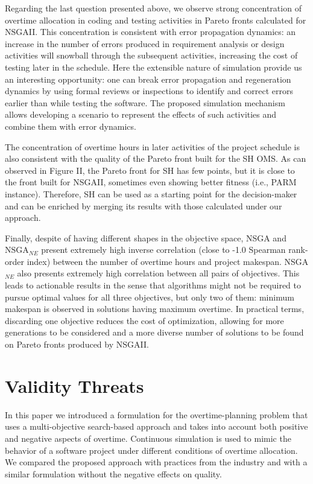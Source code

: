 \documentclass[conference]{IEEEtran}
\begin{document}
Regarding the last question presented above, we observe strong concentration of overtime allocation in coding and testing activities in Pareto fronts calculated for NSGAII. This concentration is consistent with error propagation dynamics: an increase in the number of errors produced in requirement analysis or design activities will snowball through the subsequent activities, increasing the cost of testing later in the schedule. Here the extensible nature of simulation provide us an interesting opportunity: one can break error propagation and regeneration dynamics by using formal reviews or inspections to identify and correct errors earlier than while testing the software. The proposed simulation mechanism allows developing a scenario to represent the effects of such activities \cite{Madachy:1996} and combine them with error dynamics.

The concentration of overtime hours in later activities of the project schedule is also consistent with the quality of the Pareto front built for the SH OMS. As can observed in Figure II, the Pareto front for SH has few points, but it is close to the front built for NSGAII, sometimes even showing better fitness (i.e., PARM instance). Therefore, SH can be used as a starting point for the decision-maker and can be enriched by merging its results with those calculated under our approach.

Finally, despite of having different shapes in the objective space, NSGA and NSGA$_{NE}$ present extremely high inverse correlation (close to -1.0 Spearman rank-order index) between the number of overtime hours and project makespan. NSGA$_{NE}$ also presents extremely high correlation between all pairs of objectives. This leads to actionable results in the sense that algorithms might not be required to pursue optimal values for all three objectives, but only two of them: minimum makespan is observed in solutions having maximum overtime. In practical terms, discarding one objective reduces the cost of optimization, allowing for more generations to be considered and a more diverse number of solutions to be found on Pareto fronts produced by NSGAII.

\section{Validity Threats}
In this paper we introduced a formulation for the overtime-planning problem that uses a multi-objective search-based approach and takes into account both positive and negative aspects of overtime. Continuous simulation is used to mimic the behavior of a software project under different conditions of overtime allocation. We compared the proposed approach with practices from the industry and with a similar formulation without the negative effects on quality. 
\end{document}
